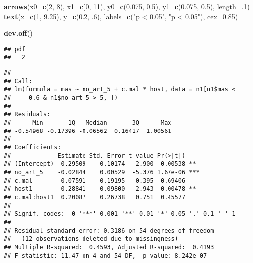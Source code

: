 \documentclass[]{article}
\newenvironment{Shaded}{\begin{snugshade}}{\end{snugshade}}
\newcommand{\KeywordTok}[1]{\textcolor[rgb]{0.13,0.29,0.53}{\textbf{#1}}}
\newcommand{\DataTypeTok}[1]{\textcolor[rgb]{0.13,0.29,0.53}{#1}}
\newcommand{\DecValTok}[1]{\textcolor[rgb]{0.00,0.00,0.81}{#1}}
\newcommand{\FloatTok}[1]{\textcolor[rgb]{0.00,0.00,0.81}{#1}}
\newcommand{\StringTok}[1]{\textcolor[rgb]{0.31,0.60,0.02}{#1}}
\newcommand{\OperatorTok}[1]{\textcolor[rgb]{0.81,0.36,0.00}{\textbf{#1}}}
\newcommand{\NormalTok}[1]{#1}
\begin{document}
\begin{Shaded}
\begin{Highlighting}[]
\KeywordTok{arrows}\NormalTok{(}\DataTypeTok{x0=}\KeywordTok{c}\NormalTok{(}\DecValTok{2}\NormalTok{, }\DecValTok{8}\NormalTok{), }\DataTypeTok{x1=}\KeywordTok{c}\NormalTok{(}\DecValTok{0}\NormalTok{, }\DecValTok{11}\NormalTok{), }\DataTypeTok{y0=}\KeywordTok{c}\NormalTok{(}\FloatTok{0.075}\NormalTok{, }\FloatTok{0.5}\NormalTok{), }\DataTypeTok{y1=}\KeywordTok{c}\NormalTok{(}\FloatTok{0.075}\NormalTok{, }\FloatTok{0.5}\NormalTok{), }\DataTypeTok{length=}\NormalTok{.}\DecValTok{1}\NormalTok{)}
\KeywordTok{text}\NormalTok{(}\DataTypeTok{x=}\KeywordTok{c}\NormalTok{(}\DecValTok{1}\NormalTok{, }\FloatTok{9.25}\NormalTok{), }\DataTypeTok{y=}\KeywordTok{c}\NormalTok{(}\FloatTok{0.2}\NormalTok{, .}\DecValTok{6}\NormalTok{), }\DataTypeTok{labels=}\KeywordTok{c}\NormalTok{(}\StringTok{"p < 0.05"}\NormalTok{, }\StringTok{"p < 0.05"}\NormalTok{), }\DataTypeTok{cex=}\FloatTok{0.85}\NormalTok{)}

\KeywordTok{dev.off}\NormalTok{()}
\end{Highlighting}
\end{Shaded}

\begin{verbatim}
## pdf 
##   2
\end{verbatim}

\begin{Shaded}
\end{Shaded}

\begin{verbatim}
## 
## Call:
## lm(formula = mas ~ no_art_5 + c.mal * host, data = n1[n1$mas < 
##     0.6 & n1$no_art_5 > 5, ])
## 
## Residuals:
##      Min       1Q   Median       3Q      Max 
## -0.54968 -0.17396 -0.06562  0.16417  1.00561 
## 
## Coefficients:
##             Estimate Std. Error t value Pr(>|t|)    
## (Intercept) -0.29509    0.10174  -2.900  0.00538 ** 
## no_art_5    -0.02844    0.00529  -5.376 1.67e-06 ***
## c.mal        0.07591    0.19195   0.395  0.69406    
## host1       -0.28841    0.09800  -2.943  0.00478 ** 
## c.mal:host1  0.20087    0.26738   0.751  0.45577    
## ---
## Signif. codes:  0 '***' 0.001 '**' 0.01 '*' 0.05 '.' 0.1 ' ' 1
## 
## Residual standard error: 0.3186 on 54 degrees of freedom
##   (12 observations deleted due to missingness)
## Multiple R-squared:  0.4593, Adjusted R-squared:  0.4193 
## F-statistic: 11.47 on 4 and 54 DF,  p-value: 8.242e-07
\end{verbatim}
\end{document}

